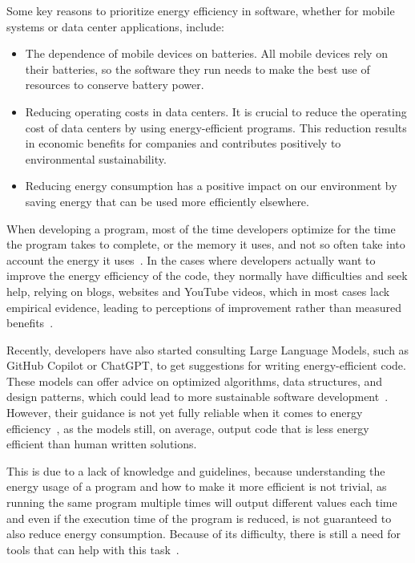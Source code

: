 Some key reasons to prioritize energy efficiency in software, whether for mobile systems or data center applications, include:

\begin{itemize}
  \item The dependence of mobile devices on batteries. All mobile devices rely on their batteries, so the software they run needs to make the best use of resources to conserve battery power.
  \item Reducing operating costs in data centers. It is crucial to reduce the operating cost of data centers by using energy-efficient programs. This reduction results in economic benefits for companies and contributes positively to environmental sustainability. 
  \item Reducing energy consumption has a positive impact on our environment by saving energy that can be used more efficiently elsewhere. 
\end{itemize}

When developing a program, most of the time developers optimize for the time the program takes to complete, or the memory it uses, and not so often take into account the energy it uses~\cite{10.1145/1666420.1666438}. 
In the cases where developers actually want to improve the energy efficiency of the code, they normally have difficulties and seek help, relying on blogs, websites and YouTube videos, which in most cases lack empirical evidence, leading to perceptions of improvement rather than measured benefits~\cite{10.1145/3154384}.

Recently, developers have also started consulting Large Language Models, such as GitHub Copilot or ChatGPT, to get suggestions for writing energy-efficient code. These models can offer advice on optimized algorithms, data structures, and design patterns, which could lead to more sustainable software development~\cite{vartziotis2024carbon,rani2025can}.
However, their guidance is not yet fully reliable when it comes to energy efficiency~\cite{islam2025evaluating}, as the models still, on average, output code that is less energy efficient than human written solutions.

This is due to a lack of knowledge and guidelines, because understanding the energy usage of a program and how to make it more efficient is not trivial, as running the same program multiple times will output different values each time and even if the execution time of the program is reduced, is not guaranteed to also reduce energy consumption. Because of its difficulty, there is still a need for tools that can help with this task~\cite{10.1145/2597073.2597110}. 

